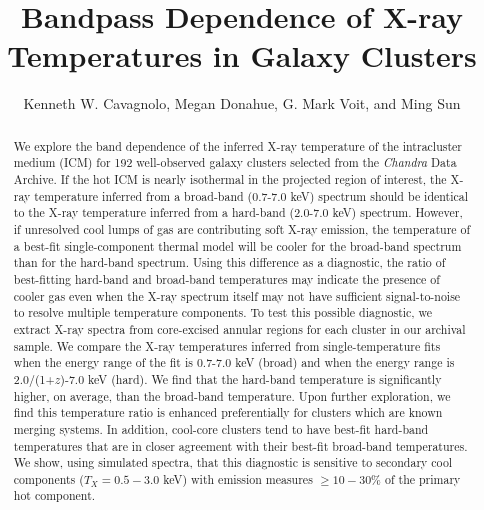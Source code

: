 \documentclass[apj]{emulateapj}
\begin{document}
\title{Bandpass Dependence of X-ray Temperatures in Galaxy Clusters}
\author{Kenneth W. Cavagnolo, Megan
Donahue, G. Mark Voit, and Ming Sun}

\submitted{ }
\begin{abstract}

We explore the band dependence of the inferred X-ray temperature of
the intracluster medium (ICM) for 192 well-observed galaxy clusters
selected from the {\it Chandra} Data Archive. If
the hot ICM is nearly isothermal in the projected region
of interest, the X-ray temperature inferred from a broad-band
(0.7-7.0 keV) spectrum should be identical to the X-ray temperature
inferred from a hard-band (2.0-7.0 keV) spectrum. However, if 
unresolved cool lumps of gas are contributing soft X-ray emission, the
temperature of a best-fit single-component thermal model will be
cooler for the broad-band spectrum than for the hard-band spectrum. Using
this difference as a diagnostic, the ratio of best-fitting hard-band
and broad-band temperatures may indicate the presence of cooler gas even
when the X-ray spectrum itself may not have sufficient signal-to-noise
to resolve multiple temperature components. To test this possible
diagnostic, we extract X-ray spectra from core-excised annular regions
for each cluster in our archival sample. We compare the X-ray
temperatures inferred from single-temperature fits when the energy
range of the fit is 0.7-7.0 keV (broad) and when the energy range is
2.0/(1+$z$)-7.0 keV (hard). We find that the hard-band temperature is
significantly higher, on average, than the broad-band
temperature. Upon further exploration, we find this temperature ratio
is enhanced preferentially for clusters which are known merging
systems. In addition, cool-core clusters tend to have best-fit hard-band
temperatures that are in closer agreement with their best-fit broad-band
temperatures. We show, using simulated spectra, that this diagnostic is
sensitive to secondary cool components ($T_X = 0.5-3.0$ keV) with
emission measures $\geq 10-30\%$ of the primary hot component.
\end{abstract}

\end{document}
